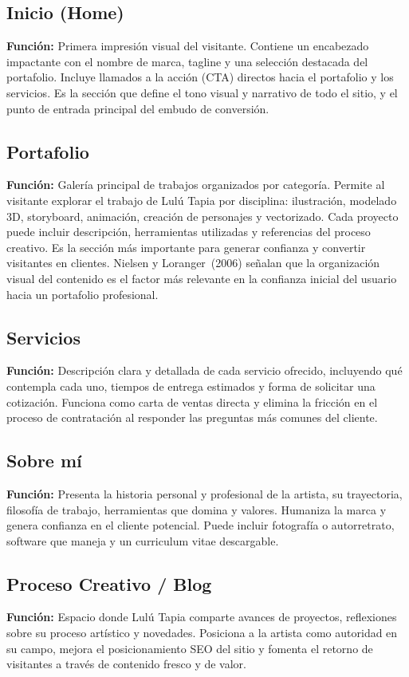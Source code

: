 \documentclass[12pt, letterpaper]{article}
\begin{document}
\vspace{6pt}

\subsection{Inicio (Home)}
\textbf{Función:} Primera impresión visual del visitante. Contiene un encabezado impactante con el nombre de marca, tagline y una selección destacada del portafolio. Incluye llamados a la acción (CTA) directos hacia el portafolio y los servicios. Es la sección que define el tono visual y narrativo de todo el sitio, y el punto de entrada principal del embudo de conversión.

\subsection{Portafolio}
\textbf{Función:} Galería principal de trabajos organizados por categoría. Permite al visitante explorar el trabajo de Lulú Tapia por disciplina: ilustración, modelado 3D, storyboard, animación, creación de personajes y vectorizado. Cada proyecto puede incluir descripción, herramientas utilizadas y referencias del proceso creativo. Es la sección más importante para generar confianza y convertir visitantes en clientes. Nielsen y Loranger~(2006) señalan que la organización visual del contenido es el factor más relevante en la confianza inicial del usuario hacia un portafolio profesional.

\subsection{Servicios}
\textbf{Función:} Descripción clara y detallada de cada servicio ofrecido, incluyendo qué contempla cada uno, tiempos de entrega estimados y forma de solicitar una cotización. Funciona como carta de ventas directa y elimina la fricción en el proceso de contratación al responder las preguntas más comunes del cliente.

\subsection{Sobre mí}
\textbf{Función:} Presenta la historia personal y profesional de la artista, su trayectoria, filosofía de trabajo, herramientas que domina y valores. Humaniza la marca y genera confianza en el cliente potencial. Puede incluir fotografía o autorretrato, software que maneja y un curriculum vitae descargable.

\subsection{Proceso Creativo / Blog}
\textbf{Función:} Espacio donde Lulú Tapia comparte avances de proyectos, reflexiones sobre su proceso artístico y novedades. Posiciona a la artista como autoridad en su campo, mejora el posicionamiento SEO del sitio y fomenta el retorno de visitantes a través de contenido fresco y de valor.
\end{document}
